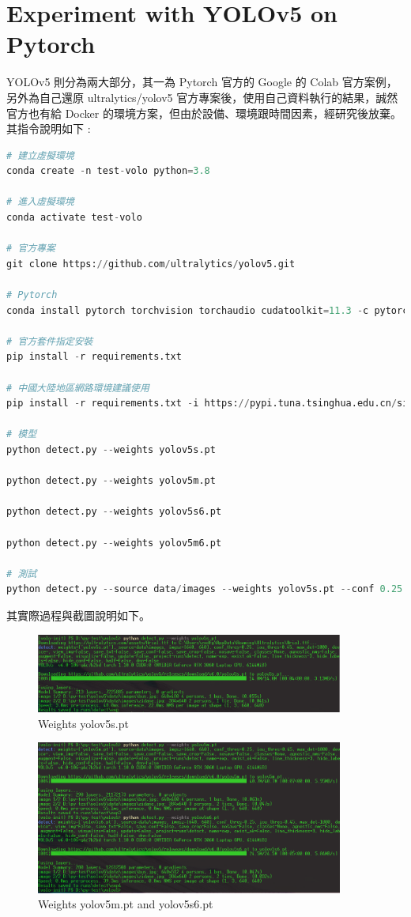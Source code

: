 \documentclass[10pt,UTF8]{ctexart}
\begin{document}
\newpage


\section{Experiment with YOLOv5 on Pytorch}

YOLOv5 則分為兩大部分，其一為 Pytorch 官方的 Google 的 Colab 官方案例，另外為自己還原 ultralytics/yolov5 官方專案後，使用自己資料執行的結果，誠然官方也有給 Docker 的環境方案，但由於設備、環境跟時間因素，經研究後放棄。其指令說明如下 :

\begin{lstlisting}[language={python}]
# 建立虛擬環境
conda create -n test-volo python=3.8

# 進入虛擬環境
conda activate test-volo

# 官方專案
git clone https://github.com/ultralytics/yolov5.git

# Pytorch
conda install pytorch torchvision torchaudio cudatoolkit=11.3 -c pytorch

# 官方套件指定安裝
pip install -r requirements.txt

# 中國大陸地區網路環境建議使用
pip install -r requirements.txt -i https://pypi.tuna.tsinghua.edu.cn/simple

# 模型
python detect.py --weights yolov5s.pt

python detect.py --weights yolov5m.pt

python detect.py --weights yolov5s6.pt

python detect.py --weights yolov5m6.pt

# 測試
python detect.py --source data/images --weights yolov5s.pt --conf 0.25
\end{lstlisting}

其實際過程與截圖說明如下。

\begin{figure}[H]
\centering 
\includegraphics[width=0.90\textwidth]{n1.png} 
\caption{Weights yolov5s.pt}
\label{Test}
\end{figure}

\begin{figure}[H]
\centering 
\includegraphics[width=0.90\textwidth]{n2.png} 
\caption{Weights yolov5m.pt and yolov5s6.pt}
\label{Test}
\end{figure}
\end{document}
